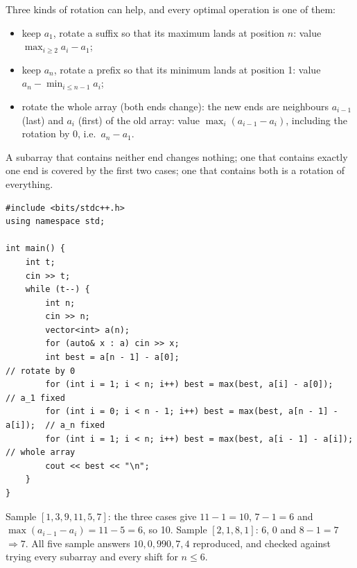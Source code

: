 \begin{solutionbox}
Three kinds of rotation can help, and every optimal operation is one of them:
\begin{itemize}[leftmargin=*]
    \item keep $a_1$, rotate a suffix so that its maximum lands at position $n$: value $\max_{i \ge 2} a_i - a_1$;
    \item keep $a_n$, rotate a prefix so that its minimum lands at position 1: value $a_n - \min_{i \le n-1} a_i$;
    \item rotate the whole array (both ends change): the new ends are neighbours $a_{i-1}$ (last) and $a_i$ (first) of the old array: value $\max_i (a_{i-1} - a_i)$, including the rotation by 0, i.e.\ $a_n - a_1$.
\end{itemize}
A subarray that contains neither end changes nothing; one that contains exactly one end is covered by the first two cases; one that contains both is a rotation of everything.
\begin{lstlisting}[style=cpp]
#include <bits/stdc++.h>
using namespace std;

int main() {
    int t;
    cin >> t;
    while (t--) {
        int n;
        cin >> n;
        vector<int> a(n);
        for (auto& x : a) cin >> x;
        int best = a[n - 1] - a[0];                                    // rotate by 0
        for (int i = 1; i < n; i++) best = max(best, a[i] - a[0]);     // a_1 fixed
        for (int i = 0; i < n - 1; i++) best = max(best, a[n - 1] - a[i]);  // a_n fixed
        for (int i = 1; i < n; i++) best = max(best, a[i - 1] - a[i]); // whole array
        cout << best << "\n";
    }
}
\end{lstlisting}
Sample $[1,3,9,11,5,7]$: the three cases give $11-1 = 10$, $7-1 = 6$ and $\max(a_{i-1}-a_i) = 11-5 = 6$, so 10. Sample $[2,1,8,1]$: $6$, $0$ and $8-1 = 7$ $\Rightarrow 7$. All five sample answers $10, 0, 990, 7, 4$ reproduced, and checked against trying every subarray and every shift for $n \le 6$.
\end{solutionbox}

